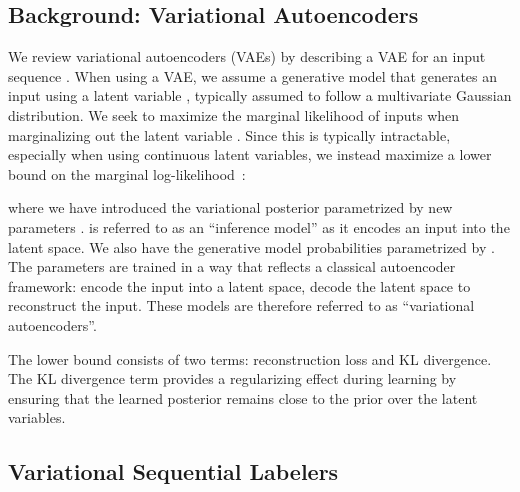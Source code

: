 \documentclass[11pt,a4paper]{article}
\begin{document}
\subsection{Background: Variational Autoencoders}
We review variational autoencoders (VAEs) by  describing a VAE for an input sequence . When using a VAE, we assume a generative model that generates an input using a latent variable , typically assumed to follow a multivariate Gaussian distribution. We seek to maximize the marginal likelihood of inputs  when marginalizing out the latent variable . Since this is typically intractable, especially when using continuous latent variables, we instead maximize a lower bound on the marginal log-likelihood~\citep{kingma2013auto}:



\noindent where we have introduced the variational posterior  parametrized by new parameters .  is referred to as an ``inference model'' as it encodes an input into the latent space. We also have the generative model probabilities  parametrized by . The parameters are trained in a way that reflects a classical autoencoder framework: encode the input into a latent space, decode the latent space to reconstruct the input. These models are therefore referred to as ``variational autoencoders''.

The lower bound consists of two terms: reconstruction loss and KL divergence.
The KL divergence term provides a regularizing effect during learning by ensuring that the learned posterior remains close to the prior over the latent variables.

\subsection{Variational Sequential Labelers}
\end{document}

